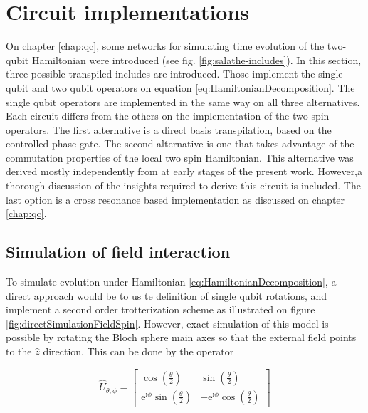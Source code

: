   

\section{Circuit implementations}
\label{sec:MainCircuits}
  
  On chapter \ref{chap:qc}, some networks for simulating time evolution of the two-qubit Hamiltonian were introduced (see fig. \ref{fig:salathe-includes}). In this section, three possible transpiled includes are introduced. Those implement the single qubit and two qubit operators on equation \ref{eq:HamiltonianDecomposition}. The single qubit operators are implemented in the same way on all three alternatives. Each circuit differs from the others on the implementation of the two spin operators. The first alternative is a direct basis transpilation, based on the controlled phase gate. The second alternative is one that takes advantage of the commutation properties of the local two spin Hamiltonian. This alternative was derived mostly independently from \cite{BellUniversalCartan} at early stages of the present work. However,a thorough discussion of the insights required to derive this circuit is included. The last option is a cross resonance based implementation as discussed on chapter \ref{chap:qc}.

  \subsection{Simulation of field interaction}
  \label{subsec:fieldInteractionCircuit}

    To simulate evolution under Hamiltonian \ref{eq:HamiltonianDecomposition}, a direct approach would be to us te definition of single qubit rotations, and implement a second order trotterization scheme as illustrated on figure \ref{fig:directSimulationFieldSpin}. However, exact simulation of this model is possible by rotating the Bloch sphere main axes so that the external field points to the $\hat{z}$ direction. This can be done by the operator

    \begin{equation}
      \hat{U}_{\theta,\phi} = \begin{bmatrix}
        \cos(\frac{\theta}{2}) & \sin(\frac{\theta}{2}) \\
        \mathrm{e}^{\mathrm{i}\phi}\sin(\frac{\theta}{2}) & -\mathrm{e}^{\mathrm{i}\phi}\cos(\frac{\theta}{2})
      \end{bmatrix}
      \label{eq:UGate}
    \end{equation}


